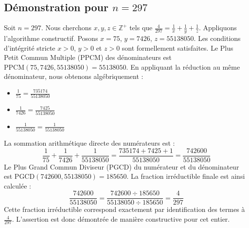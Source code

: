 \documentclass[11pt,a4paper]{article}
\begin{document}
\subsection{Démonstration pour $n = 297$}
Soit $n = 297$. Nous cherchons $x, y, z \in \mathbb{Z}^{+}$ tels que $\frac{4}{297} = \frac{1}{x} + \frac{1}{y} + \frac{1}{z}$.
Appliquons l'algorithme constructif. Posons $x = 75$, $y = 7426$, $z = 55138050$.
Les conditions d'intégrité stricte $x > 0$, $y > 0$ et $z > 0$ sont formellement satisfaites.
Le Plus Petit Commun Multiple (PPCM) des dénominateurs est $\text{PPCM}(75, 7426, 55138050) = 55138050$.
En appliquant la réduction au même dénominateur, nous obtenons algébriquement :
\begin{itemize}
    \item $\frac{1}{75} = \frac{735174}{55138050}$
    \item $\frac{1}{7426} = \frac{7425}{55138050}$
    \item $\frac{1}{55138050} = \frac{1}{55138050}$
\end{itemize}
La sommation arithmétique directe des numérateurs est :
$$ \frac{1}{75} + \frac{1}{7426} + \frac{1}{55138050} = \frac{735174 + 7425 + 1}{55138050} = \frac{742600}{55138050} $$
Le Plus Grand Commun Diviseur (PGCD) du numérateur et du dénominateur est $\text{PGCD}(742600, 55138050) = 185650$.
La fraction irréductible finale est ainsi calculée :
$$ \frac{742600}{55138050} = \frac{742600 \div 185650}{55138050 \div 185650} = \frac{4}{297} $$
Cette fraction irréductible correspond exactement par identification des termes à $\frac{4}{297}$. L'assertion est donc démontrée de manière constructive pour cet entier.
\end{document}
